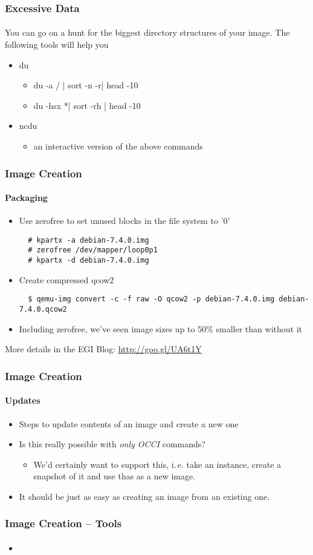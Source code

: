 \begin{frame}
\frametitle{Excessive Data}
\framesubtitle{}
You can go on a hunt for the biggest directory structures of your image. The following tools will help you
\begin{itemize}
\item du
  \begin{itemize}
  \item du -a / | sort -n -r| head -10
  \item du -hsx *| sort -rh | head -10
  \end{itemize}
\item ncdu
  \begin{itemize}
  \item an interactive version of the above commands
  \end{itemize}
\end{itemize}
\end{frame}

\begin{frame}[fragile]
\frametitle{Image Creation}
\framesubtitle{Packaging}
\begin{itemize}
\item Use zerofree to set unused blocks in the file system to '0'
  \begin{lstlisting}
  # kpartx -a debian-7.4.0.img
  # zerofree /dev/mapper/loop0p1
  # kpartx -d debian-7.4.0.img
  \end{lstlisting}
\item Create compressed qcow2
  \begin{lstlisting}
  $ qemu-img convert -c -f raw -O qcow2 -p debian-7.4.0.img debian-7.4.0.qcow2
  \end{lstlisting}
\item Including zerofree, we've seen image sizes up to 50\% smaller
  than without it
\end{itemize}
 More details in the EGI Blog:
  \url{http://goo.gl/UA6t1Y}
\end{frame}


\begin{frame}
\frametitle{Image Creation}
\framesubtitle{Updates}
\begin{itemize}
\item Steps to update contents of an image and create a new one
\item Is this really possible with \emph{only OCCI} commands?
  \begin{itemize}
  \item We'd certainly want to support this, i.\,e. take an instance,
    create a snapshot of it and use thas as a new image.
  \end{itemize}
\item It should be just as easy as creating an image from an existing one.
\end{itemize}
\end{frame}

\begin{frame}
\frametitle{Image Creation -- Tools}
\framesubtitle{}
\begin{itemize}
\item 
\end{itemize}
\end{frame}

